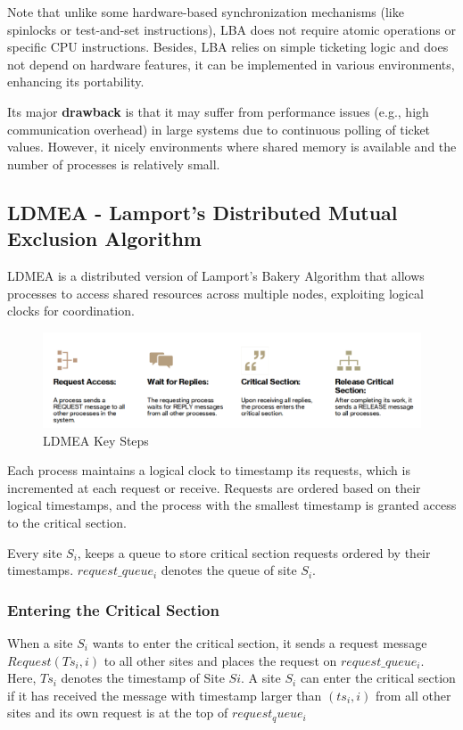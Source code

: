 Note that unlike some hardware-based synchronization mechanisms (like spinlocks or test-and-set instructions), LBA does not require atomic operations or specific CPU instructions. Besides, LBA relies on simple ticketing logic and does not depend on hardware features, it can be implemented in various environments, enhancing its portability.

Its major \textbf{drawback} is that it may suffer from performance issues (e.g., high communication overhead) in large systems due to continuous polling of ticket values.
However, it nicely environments where shared memory is available and the number of processes is relatively small.

\subsection{LDMEA - Lamport's Distributed Mutual Exclusion Algorithm}
LDMEA is a distributed version of Lamport's Bakery Algorithm that allows processes to access shared resources across multiple nodes, exploiting logical clocks for coordination.

\begin{figure}[htbp]
   \centering
   \includegraphics{images/04/ldmea_steps.png}
   \caption{LDMEA Key Steps}
   \label{fig:04/ldmea_steps}
\end{figure}

Each process maintains a logical clock to timestamp its requests, which is incremented at each request or receive.
Requests are ordered based on their logical timestamps, and the process with the smallest timestamp is granted access to the critical section.

Every site $S_i$, keeps a queue to store critical section requests ordered
by their timestamps. $request\_queue_i$ denotes the queue of site $S_i$.

\subsubsection{Entering the Critical Section}
When a site $S_i$ wants to enter the critical section, it sends a request message $Request(Ts_i, i)$ to all other sites and places the request on $request\_queue_i$. Here, $Ts_i$ denotes the timestamp of Site $Si$.
A site $S_i$ can enter the critical section if it has received the message with timestamp larger than $(ts_i, i)$ from all other sites and its own request is at the top of $request_queue_i$

